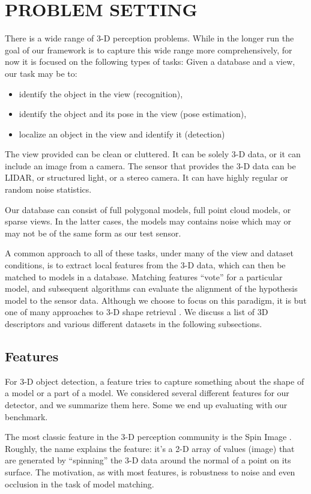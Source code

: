 \section{PROBLEM SETTING}

There is a wide range of 3-D perception problems.  While in the longer run the goal of our framework is to capture this wide range more comprehensively, for now it is focused on the following types of tasks:
Given a database and a view, our task may be to:
\begin{itemize}
\item identify the object in the view (recognition),
\item identify the object and its pose in the view (pose estimation),
\item localize an object in the view and identify it (detection)
\end{itemize}

The view provided can be clean or cluttered.
It can be solely 3-D data, or it can include an image from a camera.
The sensor that provides the 3-D data can be LIDAR, or structured light, or a stereo camera.
It can have highly regular or random noise statistics.

Our database can consist of full polygonal models, full point cloud models, or sparse views.
In the latter cases, the models may contains noise which may or may not be of the same form as our test sensor.

A common approach to all of these tasks, under many of the view and dataset conditions, is to extract local features from the 3-D data, which can then be matched to models in a database.
Matching features ``vote'' for a particular model, and subsequent algorithms can evaluate the alignment of the hypothesis model to the sensor data.
Although we choose to focus on this paradigm, it is but one of many approaches to 3-D shape retrieval \cite{Tangelder2004}. We discuss a list of 3D descriptors and various different datasets in the following subsections.

\subsection{Features}
For 3-D object detection, a feature tries to capture something about the shape of a model or a part of a model.
We considered several different features for our detector, and we summarize them here.
Some we end up evaluating with our benchmark.

The most classic feature in the 3-D perception community is the Spin Image \cite{SpinImages}.
Roughly, the name explains the feature: it's a 2-D array of values (image) that are generated by ``spinning'' the 3-D data around the normal of a point on its surface.
The motivation, as with most features, is robustness to noise and even occlusion in the task of model matching.

